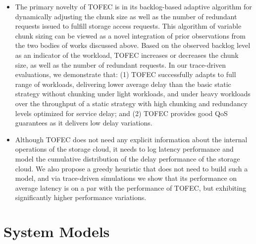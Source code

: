 \documentclass[journal]{IEEEtran}
\newcommand{\comment}[1]{}
\newcommand{\ourproposal}{TOFEC\xspace}
\begin{document}
\begin{itemize}
\item The primary novelty of \ourproposal is in its backlog-based adaptive algorithm for dynamically adjusting the chunk size as well as the number of redundant requests issued to fulfill storage access requests. This algorithm of variable chunk sizing can be viewed as a novel integration of prior observations from the two bodies of works discussed above. Based on the observed backlog level as an indicator of the workload, \ourproposal increases or decreases the chunk size, as well as the number of redundant requests. In our trace-driven evaluations, we demonstrate that: (1) \ourproposal successfully adapts to full range of workloads, delivering  lower average delay than the basic static strategy without chunking under light workloads, and under heavy workloads over  the throughput of a static strategy with high chunking and redundancy levels optimized for service delay; and (2) \ourproposal provides good QoS guarantees as it delivers low delay variations.


\comment{
\ourproposal works without any explicit information from the back-end cloud storage implementation: its adaptation strategy is implemented solely at the front-end application server (the storage client) and is based exclusively on the measured latency from unmodified cloud storage systems. This allows \ourproposal to be more easily deployed, as individual cloud applications can adopt \ourproposal without being tied-up with any particular cloud storage system, as long as a small number of APIs are provided by 
most existing popular cloud storage systems such as Amazon S3 and Microsoft's Azure Storage.
}

\item Although \ourproposal does not need any explicit information about the internal operations of the storage cloud, it needs to log latency performance and model the cumulative distribution of the delay performance of the storage cloud. We also propose a greedy heuristic that does not need to build such a model, and via trace-driven simulations we show that its performance on average latency is on a par with the performance of \ourproposal, but exhibiting significantly higher performance variations.

\end{itemize}

\section{System Models}
\label{sec:system}
\end{document}
